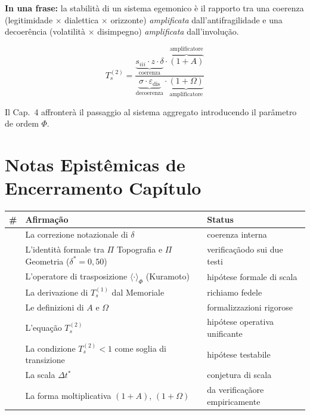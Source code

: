 \Proved{} \textbf{In una frase:} la stabilità di un sistema egemonico è
il rapporto tra una coerenza (legitimidade $\times$ dialettica $\times$ orizzonte)
\emph{amplificata} dall'antifragilidade e una decoerência (volatilità $\times$
disimpegno) \emph{amplificata} dall'involução.

\[
T_s^{(2)} = \frac{\underbrace{s_{iii} \cdot z \cdot \delta}_{\text{coerenza}} \cdot \overbrace{(1+A)}^{\text{amplificatore}}}{\underbrace{\sigma \cdot \varepsilon_{\text{dis}}}_{\text{decoerenza}} \cdot \underbrace{(1+\Omega)}_{\text{amplificatore}}}
\]

Il Cap.~4 affronterà il passaggio al sistema aggregato introducendo il
parâmetro de ordem \(\Phi\).



\section{Notas Epistêmicas de Encerramento
Capítulo}\label{note-epistemiche-di-chiusura-capítulo}

{\def\LTcaptype{none} %
{\small\begin{longtable}[]{@{}
  >{\raggedright\arraybackslash}p{}
  >{\raggedright\arraybackslash}p{}
  >{\raggedright\arraybackslash}p{}@{}}
\toprule\noalign{}
\begin{minipage}[b]{\linewidth}\raggedright
\#
\end{minipage} & \begin{minipage}[b]{\linewidth}\raggedright
Afirmação
\end{minipage} & \begin{minipage}[b]{\linewidth}\raggedright
Status
\end{minipage} \\
\midrule\noalign{}
\endhead
\bottomrule\noalign{}
\endlastfoot
1 & La correzione notazionale di \(\delta\) & \Proved{} coerenza
interna \\
2 & L'identità formale tra \(\Pi\) Topografia e \(\Pi\) Geometria
(\(\delta^*=0{,}50\)) & \Proved{} verificaçãodo sui due testi \\
3 & L'operatore di trasposizione \(\langle\cdot\rangle_\Phi\) (Kuramoto)
& \Hypoth{} hipótese formale di scala \\
4 & La derivazione di \(T_s^{(1)}\) dal Memoriale & \Proved{} richiamo
fedele \\
5 & Le definizioni di \(A\) e \(\Omega\) & \Proved{} formalizzazioni
rigorose \\
6 & L'equação \(T_s^{(2)}\) & \Hypoth{} hipótese operativa
unificante \\
7 & La condizione \(T_s^{(2)} < 1\) come soglia di transizione &
\Hypoth{} hipótese testabile \\
8 & La scala \(\Delta t^*\) & \Conj{} conjetura di scala \\
9 & La forma moltiplicativa \((1+A)\), \((1+\Omega)\) & \ToVerify{} da
verificaçãore empiricamente \\
\end{longtable}}
}



